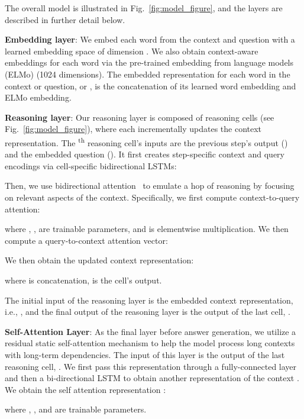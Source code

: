 \documentclass[11pt,a4paper]{article}
\def\figref#1{Fig.~\ref{#1}}
\begin{document}
The overall model is illustrated in \figref{fig:model_figure}, and the layers are described in further detail below.

\noindent\textbf{Embedding layer}:
We embed each word from the context and question with a learned embedding space of dimension .
We also obtain context-aware embeddings for each word via the pre-trained embedding from language models (ELMo) (1024 dimensions).
The embedded representation for each word in the context or question,  or , is the concatenation of its learned word embedding and ELMo embedding.


\noindent\textbf{Reasoning layer}: Our reasoning layer is composed of  reasoning cells (see \figref{fig:model_figure}), where each incrementally updates the context representation.
The \textsuperscript{th} reasoning cell's inputs are the previous step's output () and the embedded question (). It first creates step-specific context and query encodings via cell-specific bidirectional LSTMs:
\vspace{-3pt}

Then, we use bidirectional attention~\cite{seo2016bidirectional} to emulate a hop of reasoning by focusing on relevant aspects of the context.
Specifically, we first compute context-to-query attention:



where , ,  are trainable parameters, and  is
elementwise multiplication.
We then compute a query-to-context attention vector:



We then obtain the updated context representation:

where  is concatenation,  is the cell's output.



The initial input of the reasoning layer is the embedded context representation, i.e., , and the final output of the reasoning layer is the output of the last cell, .

\noindent\textbf{Self-Attention Layer}:
As the final layer before answer generation, we utilize a residual static self-attention mechanism \cite{clark2017simple} to help the model process long contexts with long-term dependencies.
The input of this layer is the output of the last reasoning cell, . We first pass this representation through a fully-connected layer and then a bi-directional LSTM to obtain another representation of the context .
We obtain the self attention representation :



where , , and  are trainable parameters. 
\end{document}
